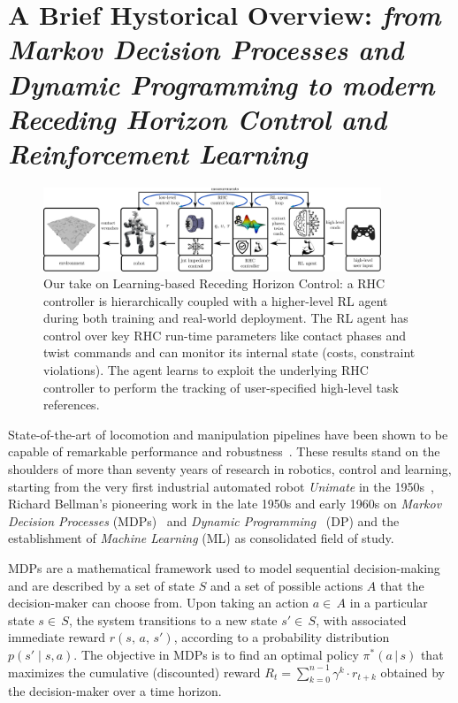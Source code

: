 \section{A Brief Hystorical Overview: \textnormal{\textit{from Markov Decision Processes and Dynamic Programming to modern Receding Horizon Control and Reinforcement Learning}}}
\begin{figure}[t]
	\centering
	\vspace{0.1cm}
	\includegraphics[width=0.9\textwidth]{imgs/learning_based_rhc.pdf}
	\caption{Our take on Learning-based Receding Horizon Control: a RHC controller is hierarchically coupled with a higher-level RL agent during both training and real-world deployment. The RL agent has control over key RHC run-time parameters like contact phases and twist commands and can monitor its internal state (costs, constraint violations). The agent learns to exploit the underlying RHC controller to perform the tracking of user-specified high-level task references.}
	\label{fig:lrhc_arch}
\end{figure}
State-of-the-art of locomotion and manipulation pipelines have been shown to be capable of remarkable performance and robustness~\cite{rl:schneider2023learning,rl:miki2024learning,web::atlas_grip_boston_dyn,web::lrhc_boston_dyn}. These results stand on the shoulders of more than seventy years of research in robotics, control and learning, starting from the very first industrial automated robot \textit{Unimate} in the 1950s~\cite{origins:xu2018fourth}, Richard Bellman's pioneering work in the late 1950s and early 1960s on \textit{Markov Decision Processes} (MDPs)~\cite{rl:bellman1957markovian} and \textit{Dynamic Programming}~\cite{rl:bellman1960dynamic} (DP) and the establishment of \textit{Machine Learning} (ML) as consolidated field of study.

MDPs are a mathematical framework used to model sequential decision-making and are described by a set of state $S$ and a set of possible actions $A$ that the decision-maker can choose from. Upon taking an action $a\in\,A$ in a particular state $s\in\,S$, the system transitions to a new state $s'\in\,S$, with associated immediate reward $r(s,\,a,\,s')$, according to a probability distribution $p(s'\mid s, a)$. The objective in MDPs is to find an optimal policy $\pi^{*}(a\,\vert\,s)$ that maximizes the cumulative (discounted) reward $R_t = \sum_{k=0}^{n-1} \gamma^k \cdot r_{t+k}$ obtained by the decision-maker over a time horizon.

